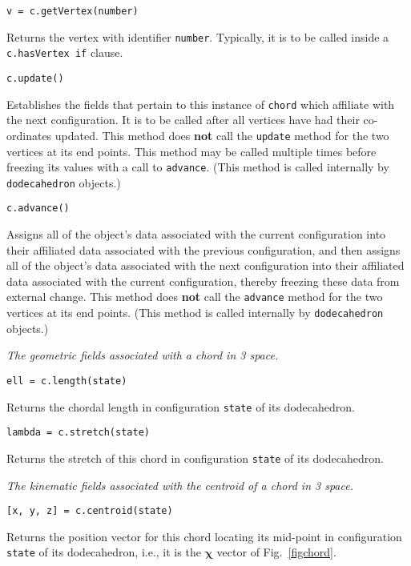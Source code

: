 \medskip\noindent
\texttt{v = c.getVertex(number)}

\medskip\noindent
Returns the vertex with identifier \texttt{number}.  Typically, it is to be called inside a \texttt{c.hasVertex if} clause.

\medskip\noindent
\texttt{c.update()}

\medskip\noindent
Establishes the fields that pertain to this instance of \texttt{chord} which affiliate with the next configuration.  It is to be called after all vertices
have had their co-ordinates updated.  This method does \textbf{not} call the \texttt{update} method for the two vertices at its end points.  This method may be called multiple times before freezing its values with a call to \texttt{advance}.  (This method is called internally by \texttt{dodecahedron} objects.)

\newpage
\medskip\noindent
\texttt{c.advance()}

\medskip\noindent
Assigns all of the object's data associated with the current configuration into their affiliated data associated with the previous configuration, and then assigns all of the object's data associated with the next configuration into their affiliated data associated with the current configuration, thereby freezing these data from external change.  This method does \textbf{not} call the \texttt{advance} method for the two vertices at its end points. (This method is called internally by \texttt{dodecahedron} objects.)

\medskip\noindent
\textit{The geometric fields associated with a chord in 3 space.}

\medskip\noindent
\texttt{ell = c.length(state)}

\medskip\noindent
Returns the chordal length in configuration \texttt{state} of its dodecahedron.

\medskip\noindent
\texttt{lambda = c.stretch(state)}

\medskip\noindent
Returns the stretch of this chord in configuration \texttt{state} of its dodecahedron.

\medskip\noindent
\textit{The kinematic fields associated with the centroid of a chord in 3 space.}

\medskip\noindent
\texttt{[x, y, z] = c.centroid(state)}

\medskip\noindent
Returns the position vector for this chord locating its mid-point in configuration \texttt{state} of its dodecahedron, i.e., it is the $\boldsymbol{\chi}$ vector of Fig.~\ref{figchord}.

